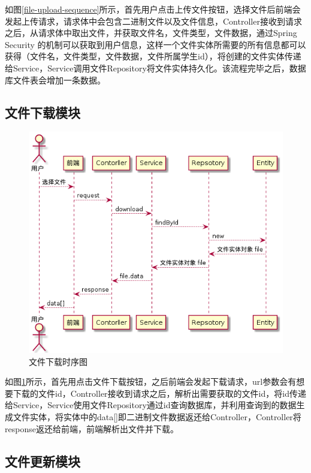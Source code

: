 如图\ref{file-upload-sequence}所示，首先用户点击上传文件按钮，选择文件后前端会发起上传请求，请求体中会包含二进制文件以及文件信息，Controller接收到请求之后，从请求体中取出文件，并获取文件名，文件类型，文件数据，通过Spring Security 的机制可以获取到用户信息，这样一个文件实体所需要的所有信息都可以获得（文件名，文件类型，文件数据，文件所属学生id），将创建的文件实体传递给Service，Service调用文件Repository将文件实体持久化。该流程完毕之后，数据库文件表会增加一条数据。

\subsection{文件下载模块}

\begin{figure}[htbp]
    \centering
    \includegraphics[scale = 0.6]{out/uml/时序图/file-download-sequence/file-download-sequence.png}
    \caption{\song\wuhao 文件下载时序图}
    \label{file-download-sequence}
\end{figure}

如图\ref{file-download-sequence}所示，首先用点击文件下载按钮，之后前端会发起下载请求，url参数会有想要下载的文件id，Controller接收到请求之后，解析出需要获取的文件id，将id传递给Service，Service使用文件Repository通过id查询数据库，并利用查询到的数据生成文件实体，将实体中的data[]即二进制文件数据返还给Controller，Controller将response返还给前端，前端解析出文件并下载。

\subsection{文件更新模块}

